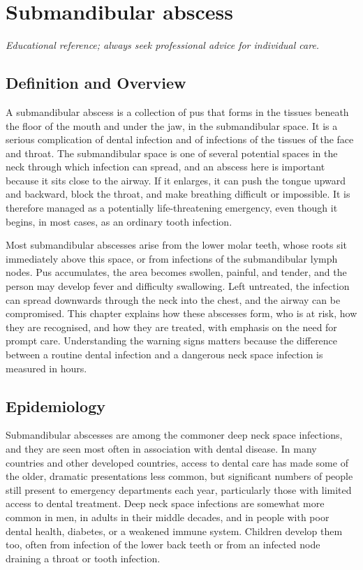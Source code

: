 \chapter{Submandibular abscess}

\medskip
\noindent\textit{Educational reference; always seek professional advice for individual care.}

\section*{Definition and Overview}
A submandibular abscess is a collection of pus that forms in the tissues beneath the floor of the mouth and under the jaw, in the submandibular space. It is a serious complication of dental infection and of infections of the tissues of the face and throat. The submandibular space is one of several potential spaces in the neck through which infection can spread, and an abscess here is important because it sits close to the airway. If it enlarges, it can push the tongue upward and backward, block the throat, and make breathing difficult or impossible. It is therefore managed as a potentially life-threatening emergency, even though it begins, in most cases, as an ordinary tooth infection.

Most submandibular abscesses arise from the lower molar teeth, whose roots sit immediately above this space, or from infections of the submandibular lymph nodes. Pus accumulates, the area becomes swollen, painful, and tender, and the person may develop fever and difficulty swallowing. Left untreated, the infection can spread downwards through the neck into the chest, and the airway can be compromised. This chapter explains how these abscesses form, who is at risk, how they are recognised, and how they are treated, with emphasis on the need for prompt care. Understanding the warning signs matters because the difference between a routine dental infection and a dangerous neck space infection is measured in hours.

\section*{Epidemiology}
Submandibular abscesses are among the commoner deep neck space infections, and they are seen most often in association with dental disease. In many countries and other developed countries, access to dental care has made some of the older, dramatic presentations less common, but significant numbers of people still present to emergency departments each year, particularly those with limited access to dental treatment. Deep neck space infections are somewhat more common in men, in adults in their middle decades, and in people with poor dental health, diabetes, or a weakened immune system. Children develop them too, often from infection of the lower back teeth or from an infected node draining a throat or tooth infection.

